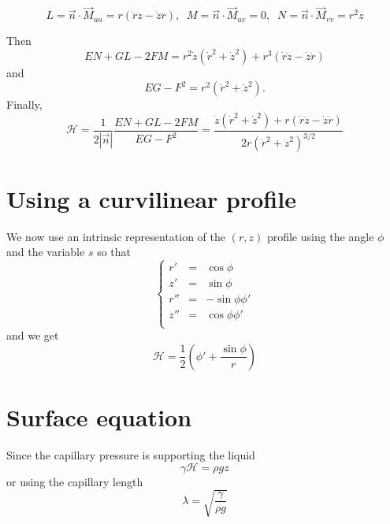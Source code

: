 \documentclass[aps,onecolumn]{revtex4}
\begin{document}
\begin{equation}
	L = \vec{n}\cdot\vec{M}_{uu} = r\left(\dot{r}\ddot{z}-\dot{z}\ddot{r}\right),\;\;
	M = \vec{n}\cdot\vec{M}_{uv} = 0,
	\;\;
	N = \vec{n}\cdot\vec{M}_{vv} = r^2\dot{z}
\end{equation}

Then
\begin{equation}
	EN + GL - 2FM = r^2 \dot{z} \left(\dot{r}^2 + \dot{z}^2\right) + r^3\left(\dot{r}\ddot{z}-\dot{z}\ddot{r}\right)
\end{equation}
and
\begin{equation}
	EG - F^2 = r^2 \left(\dot{r}^2 + \dot{z}^2\right).
\end{equation}
Finally, 
\begin{equation}
	\mathcal{H} = \dfrac{1}{2\left\vert\vec{n}\right\vert} \dfrac{EN + GL - 2FM}{EG - F^2} =
	\dfrac{\dot{z} \left(\dot{r}^2 + \dot{z}^2\right) + r\left(\dot{r}\ddot{z}-\dot{z}\ddot{r}\right)}
	{2r\left(\dot{r}^2 + \dot{z}^2\right)^{3/2}}
\end{equation}

\section{Using a curvilinear profile}
We now use an intrinsic representation of the $(r,z)$ profile using the
angle $\phi$ and the variable $s$ so that
\begin{equation}
\left\lbrace
	\begin{array}{rcl}
	r' & = & \cos \phi\\
	z' & = & \sin \phi\\
	r'' & = & -\sin\phi \phi'\\
	z'' & = & \cos\phi  \phi'\\
	\end{array}
\right.
\end{equation}
and we get
\begin{equation}
	\mathcal{H} = \frac{1}{2} \left(\phi'+\dfrac{\sin\phi}{r}\right)
\end{equation}

\section{Surface equation}
Since the capillary pressure is supporting the liquid
\begin{equation}
	\gamma \mathcal{H} = \rho g z
\end{equation}
or using the capillary length
\begin{equation}
	\lambda = \sqrt{\dfrac{\gamma}{\rho g}}
\end{equation}
\end{document}
